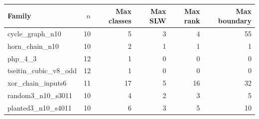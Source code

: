 \begin{tabular}{lrrrrr}
\toprule
Family & $n$ & Max classes & Max SLW & Max rank & Max boundary \\
\midrule
cycle\_graph\_n10 & 10 & 5 & 3 & 4 & 55 \\
horn\_chain\_n10 & 10 & 2 & 1 & 1 & 1 \\
php\_4\_3 & 12 & 1 & 0 & 0 & 0 \\
tseitin\_cubic\_v8\_odd & 12 & 1 & 0 & 0 & 0 \\
xor\_chain\_inputs6 & 11 & 17 & 5 & 16 & 32 \\
random3\_n10\_s3011 & 10 & 4 & 2 & 3 & 5 \\
planted3\_n10\_s4011 & 10 & 6 & 3 & 5 & 10 \\
\bottomrule
\end{tabular}